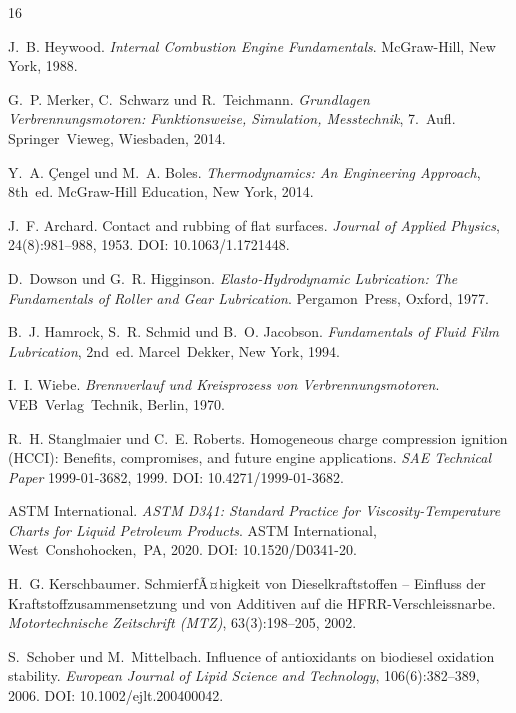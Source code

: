 ﻿\documentclass[12pt,a4paper]{article}
\begin{document}
\begin{thebibliography}{16}

  J.~B. Heywood.
  \textit{Internal Combustion Engine Fundamentals}.
  McGraw-Hill, New York, 1988.

  G.~P. Merker, C.~Schwarz und R.~Teichmann.
  \textit{Grundlagen Verbrennungsmotoren: Funktionsweise, Simulation, Messtechnik}, 7.~Aufl.
  Springer~Vieweg, Wiesbaden, 2014.

  Y.~A. \c{C}engel und M.~A. Boles.
  \textit{Thermodynamics: An Engineering Approach}, 8th~ed.
  McGraw-Hill Education, New York, 2014.

  J.~F. Archard.
  Contact and rubbing of flat surfaces.
  \textit{Journal of Applied Physics}, 24(8):981--988, 1953.
  DOI: 10.1063/1.1721448.

  D.~Dowson und G.~R. Higginson.
  \textit{Elasto-Hydrodynamic Lubrication: The Fundamentals of Roller and Gear Lubrication}.
  Pergamon~Press, Oxford, 1977.

  B.~J. Hamrock, S.~R. Schmid und B.~O. Jacobson.
  \textit{Fundamentals of Fluid Film Lubrication}, 2nd~ed.
  Marcel~Dekker, New York, 1994.

  I.~I. Wiebe.
  \textit{Brennverlauf und Kreisprozess von Verbrennungsmotoren}.
  VEB~Verlag~Technik, Berlin, 1970.

  R.~H. Stanglmaier und C.~E. Roberts.
  Homogeneous charge compression ignition (HCCI): Benefits, compromises, and future engine applications.
  \textit{SAE Technical Paper} 1999-01-3682, 1999.
  DOI: 10.4271/1999-01-3682.

  ASTM International.
  \textit{ASTM D341: Standard Practice for Viscosity-Temperature Charts for Liquid Petroleum
  Products}.
  ASTM International, West~Conshohocken,~PA, 2020.
  DOI: 10.1520/D0341-20.

  H.~G. Kerschbaumer.
  SchmierfÃ¤higkeit von Dieselkraftstoffen -- Einfluss der Kraftstoffzusammensetzung
  und von Additiven auf die HFRR-Verschleissnarbe.
  \textit{Motortechnische Zeitschrift (MTZ)}, 63(3):198--205, 2002.

  S.~Schober und M.~Mittelbach.
  Influence of antioxidants on biodiesel oxidation stability.
  \textit{European Journal of Lipid Science and Technology}, 106(6):382--389, 2006.
  DOI: 10.1002/ejlt.200400042.


\end{thebibliography}
\end{document}

